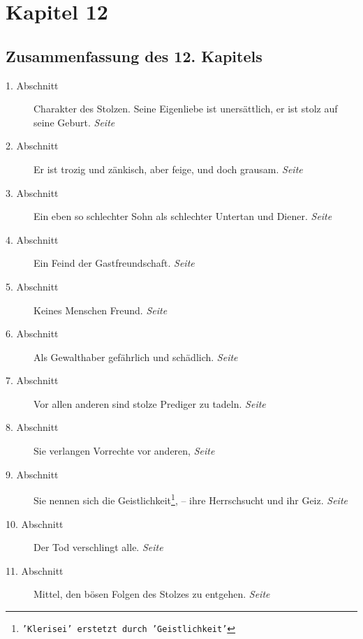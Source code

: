 
\chapter{Kapitel 12} \label{kap12}

\section{Zusammenfassung des 12. Kapitels}

\begin{description}
\item[1. Abschnitt] Charakter des Stolzen. Seine Eigenliebe ist unersättlich,
er
ist stolz auf seine Geburt.
\dotfill \textit{Seite~\pageref{kap12_ab1}}\\
\item[2. Abschnitt] Er ist trozig und zänkisch, aber feige, und doch grausam.
\dotfill \textit{Seite~\pageref{kap12_ab2}}\\
\item[3. Abschnitt] Ein eben so schlechter Sohn als schlechter Untertan und
Diener.
\dotfill \textit{Seite~\pageref{kap12_ab3}}\\
\item[4. Abschnitt] Ein Feind der Gastfreundschaft.
\dotfill \textit{Seite~\pageref{kap12_ab4}}\\
\item[5. Abschnitt] Keines Menschen Freund.
\dotfill \textit{Seite~\pageref{kap12_ab5}}\\
\item[6. Abschnitt] Als Gewalthaber gefährlich und schädlich.
\dotfill \textit{Seite~\pageref{kap12_ab6}}\\
\item[7. Abschnitt] Vor allen anderen sind stolze Prediger zu tadeln.
\dotfill \textit{Seite~\pageref{kap12_ab7}}\\
\item[8. Abschnitt] Sie verlangen Vorrechte vor anderen,
\dotfill \textit{Seite~\pageref{kap12_ab8}}\\
\item[9. Abschnitt] Sie nennen sich die Geistlichkeit\footnote{\texttt{'Klerisei' erstetzt durch 'Geistlichkeit'}}, -- ihre Herrschsucht und ihr Geiz.
\dotfill \textit{Seite~\pageref{kap12_ab9}}\\
\item[10. Abschnitt] Der Tod verschlingt alle.
\dotfill \textit{Seite~\pageref{kap12_ab10}}\\
\item[11. Abschnitt] Mittel, den bösen Folgen des Stolzes zu entgehen.
\dotfill \textit{Seite~\pageref{kap12_ab11}}\\
\end{description}

